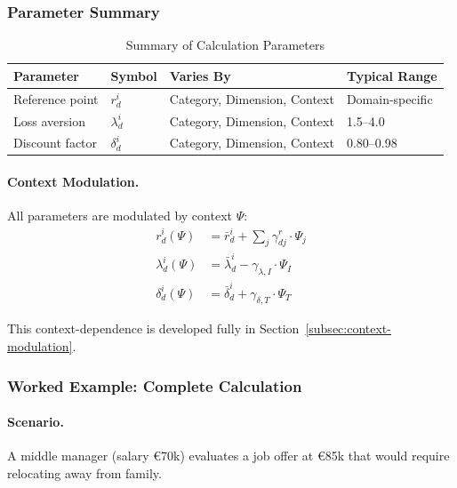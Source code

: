 \subsubsection{Parameter Summary}

\begin{table}[htbp]
\centering
\caption{Summary of Calculation Parameters}
\label{tab:parameter-summary}
\renewcommand{\arraystretch}{1.4}
\begin{tabular}{@{}llll@{}}
\toprule
\textbf{Parameter} & \textbf{Symbol} & \textbf{Varies By} & \textbf{Typical Range} \\
\midrule
Reference point & $r^i_d$ & Category, Dimension, Context & Domain-specific \\
Loss aversion & $\lambda^i_d$ & Category, Dimension, Context & 1.5--4.0 \\
Discount factor & $\delta^i_d$ & Category, Dimension, Context & 0.80--0.98 \\
\bottomrule
\end{tabular}
\end{table}

\paragraph{Context Modulation.}
All parameters are modulated by context $\Psi$:
\begin{align}
r^i_d(\Psi) &= \bar{r}^i_d + \sum_j \gamma^r_{dj} \cdot \Psi_j \\
\lambda^i_d(\Psi) &= \bar{\lambda}^i_d - \gamma_{\lambda,I} \cdot \Psi_I \\
\delta^i_d(\Psi) &= \bar{\delta}^i_d + \gamma_{\delta,T} \cdot \Psi_T
\end{align}

This context-dependence is developed fully in Section~\ref{subsec:context-modulation}.

\subsubsection{Worked Example: Complete Calculation}

\paragraph{Scenario.}
A middle manager (salary \euro{70k}) evaluates a job offer at \euro{85k} 
that would require relocating away from family.


